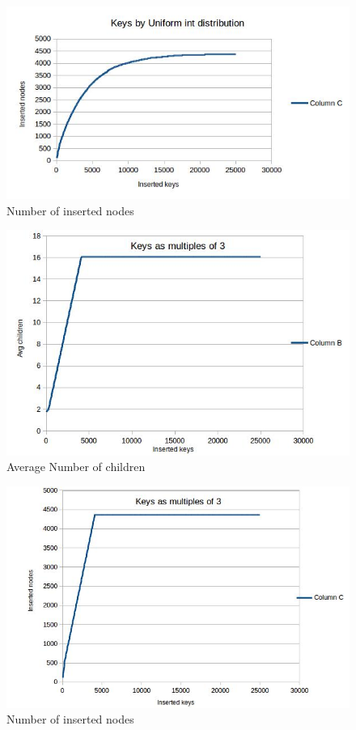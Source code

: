 \documentclass{report}
\begin{document}
\begin{figure}
  \includegraphics[scale=0.4]{uniformnode}
  \caption{Number of inserted nodes}
\end{figure}

\begin{figure}
 \includegraphics[scale=0.4]{mul3child}
 \caption{Average Number of children}
\end{figure}

\begin{figure}
 \includegraphics[scale=0.4]{mul3node}
 \caption{Number of inserted nodes}
\end{figure}
\end{document}
